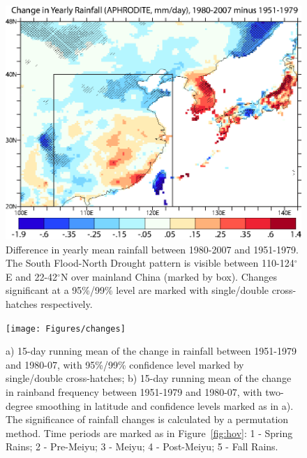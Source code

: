 \documentclass{ametsoc}
\begin{document}
\begin{figure}
\centering
\noindent\includegraphics[width=36pc]{Figures/SFND}
\caption{Difference in yearly mean rainfall between 1980-2007 and 1951-1979. The South Flood-North Drought pattern is visible between 110-124$^{\circ}$E and 22-42$^{\circ}$N over mainland China (marked by box). Changes significant at a 95\%/99\% level are marked with single/double cross-hatches respectively.}
\label{fig:f31}
\end{figure}

\begin{figure}[htbp]
\centering
\noindent\texttt{[image: Figures/changes]}
\caption{a) 15-day running mean of the change in rainfall between 1951-1979 and 1980-07, with 95\%/99\% confidence level marked by single/double cross-hatches; b) 15-day running mean of the change in rainband frequency between 1951-1979 and 1980-07, with two-degree smoothing in latitude and confidence levels marked as in a). The significance of rainfall changes is calculated by a permutation method. Time periods are marked as in Figure~\ref{fig:hov}: 1 - Spring Rains; 2 - Pre-Meiyu; 3 - Meiyu; 4 - Post-Meiyu; 5 - Fall Rains.}
\label{fig:changes}
\end{figure}
\end{document}
